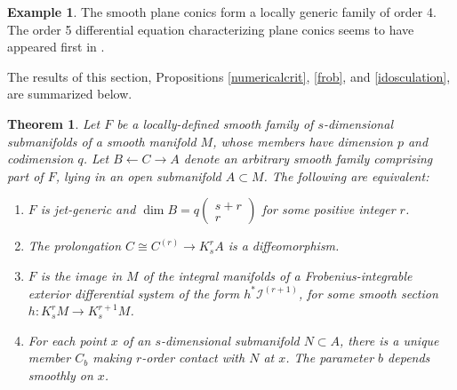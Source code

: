 \documentclass[12pt]{article}
\numberwithin{equation}{section}
\theoremstyle{plain}
\newtheorem{theorem}[definition]{Theorem}
\theoremstyle{definition}
\newtheorem{example}[definition]{Example}
\newcommand{\la}{\leftarrow}
\newcommand{\ra}{\rightarrow}
\begin{document}
\begin{example}
The smooth plane conics form a locally generic family of order 4. The order 5 differential equation characterizing plane conics seems to have appeared first in \cite{halphen}.
\end{example}

The results of this section, Propositions \ref{numericalcrit}, \ref{frob}, and \ref{idosculation}, are summarized below.
\begin{theorem} Let $F$ be a locally-defined smooth family of $s$-dimensional submanifolds of a smooth manifold $M$, whose members have dimension $p$ and codimension $q$. Let $B\la C\ra A$ denote an arbitrary smooth family comprising part of $F$, lying in an open submanifold $A\subset M$. The following are equivalent:
\begin{enumerate}
\item{$F$ is jet-generic and $\dim B = q\begin{pmatrix}s+r \\ r\end{pmatrix}$ for some positive integer $r$.}
\item{The prolongation $C\cong C^{(r)}\ra K^{r}_{s}A$ is a diffeomorphism.}
\item{$F$ is the image in $M$ of the integral manifolds of a Frobenius-integrable exterior differential system of the form $h^{*}\mathcal{I}^{(r+1)}$, for some smooth section $h:K^{r}_{s}M\ra K^{r+1}_{s}M$.}
\item{For each point $x$ of an $s$-dimensional submanifold $N\subset A$, there is a unique member $C_b$ making $r$-order contact with $N$ at $x$. The parameter $b$ depends smoothly on $x$.}
\end{enumerate}
\end{theorem}


\end{document}
